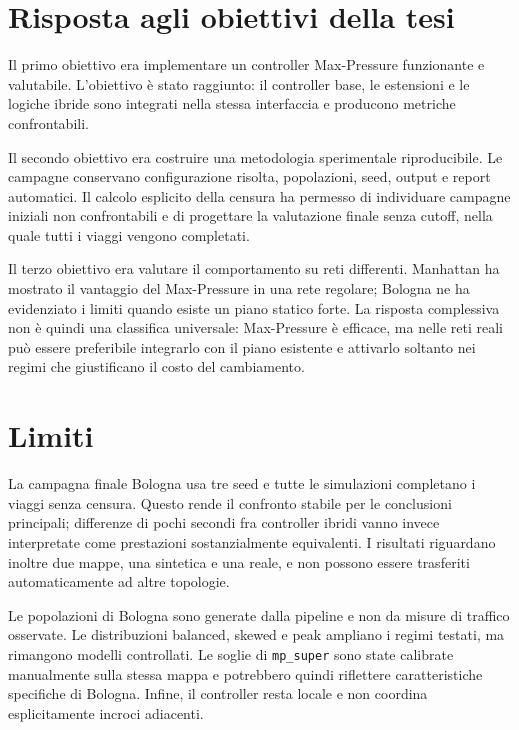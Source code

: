 \documentclass[12pt,a4paper,oneside]{report}
\numberwithin{equation}{chapter}
\begin{document}
\section{Risposta agli obiettivi della tesi}

Il primo obiettivo era implementare un controller Max-Pressure funzionante e
valutabile. L'obiettivo è stato raggiunto: il controller base, le estensioni e
le logiche ibride sono integrati nella stessa interfaccia e producono metriche
confrontabili.

Il secondo obiettivo era costruire una metodologia sperimentale riproducibile.
Le campagne conservano configurazione risolta, popolazioni, seed, output e report
automatici. Il calcolo esplicito della censura ha permesso di individuare
campagne iniziali non confrontabili e di progettare la valutazione finale senza
cutoff, nella quale tutti i viaggi vengono completati.

Il terzo obiettivo era valutare il comportamento su reti differenti. Manhattan
ha mostrato il vantaggio del Max-Pressure in una rete regolare; Bologna ne ha
evidenziato i limiti quando esiste un piano statico forte. La risposta
complessiva non è quindi una classifica universale: Max-Pressure è efficace,
ma nelle reti reali può essere preferibile integrarlo con il piano esistente e
attivarlo soltanto nei regimi che giustificano il costo del cambiamento.

\section{Limiti}

La campagna finale Bologna usa tre seed e tutte le simulazioni completano i
viaggi senza censura. Questo rende il confronto stabile per le conclusioni
principali; differenze di pochi secondi fra controller ibridi vanno invece
interpretate come prestazioni sostanzialmente equivalenti. I risultati
riguardano inoltre due mappe, una sintetica e una reale, e non possono essere
trasferiti automaticamente ad altre topologie.

Le popolazioni di Bologna sono generate dalla pipeline e non da misure di
traffico osservate. Le distribuzioni balanced, skewed e peak ampliano i regimi
testati, ma rimangono modelli controllati. Le soglie di \texttt{mp\_super}
sono state calibrate manualmente sulla stessa mappa e potrebbero quindi
riflettere caratteristiche specifiche di Bologna. Infine, il controller resta
locale e non coordina esplicitamente incroci adiacenti.
\end{document}
